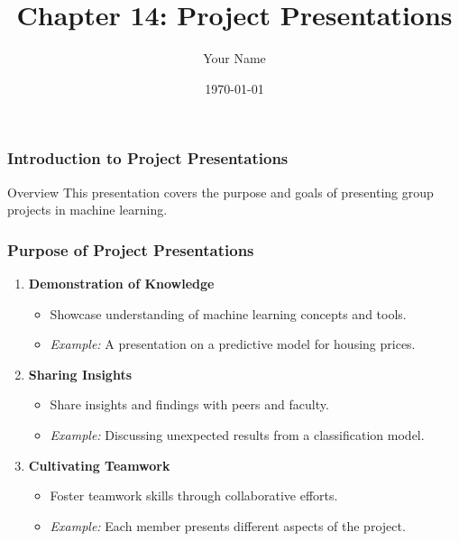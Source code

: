 \documentclass{beamer}
\title{Chapter 14: Project Presentations}
\author{Your Name}
\institute{Your Institution}
\date{\today}
\begin{document}
\frame{\titlepage}

\begin{frame}[fragile]
    \frametitle{Introduction to Project Presentations}
    \begin{block}{Overview}
        This presentation covers the purpose and goals of presenting group projects in machine learning.
    \end{block}
\end{frame}

\begin{frame}[fragile]
    \frametitle{Purpose of Project Presentations}
    \begin{enumerate}
        \item \textbf{Demonstration of Knowledge}
            \begin{itemize}
                \item Showcase understanding of machine learning concepts and tools.
                \item \textit{Example:} A presentation on a predictive model for housing prices.
            \end{itemize}
        
        \item \textbf{Sharing Insights}
            \begin{itemize}
                \item Share insights and findings with peers and faculty.
                \item \textit{Example:} Discussing unexpected results from a classification model.
            \end{itemize}

        \item \textbf{Cultivating Teamwork}
            \begin{itemize}
                \item Foster teamwork skills through collaborative efforts.
                \item \textit{Example:} Each member presents different aspects of the project.
            \end{itemize}
    \end{enumerate}
\end{frame}
\end{document}
